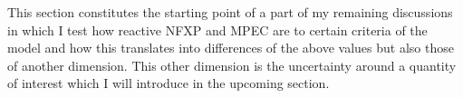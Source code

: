 This section constitutes the starting point of a part of my remaining discussions in which I test how reactive NFXP and MPEC are to certain criteria of the model and how this translates into differences of the above values but also those of another dimension. This other dimension is the uncertainty around a quantity of interest which I will introduce in the upcoming section.

